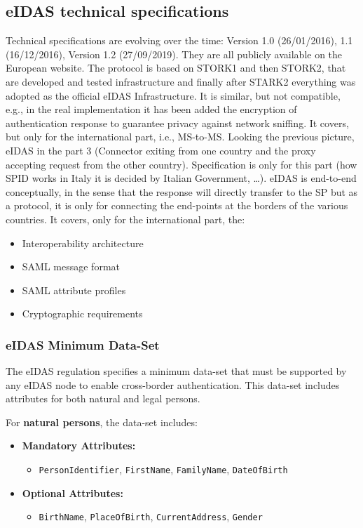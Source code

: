 \subsection{eIDAS technical specifications}
Technical specifications are evolving over the time: Version 1.0
(26/01/2016), 1.1 (16/12/2016), Version 1.2 (27/09/2019). They are all
publicly available on the European website. The protocol is based on
STORK1 and then STORK2, that are developed and tested infrastructure
and finally after STARK2 everything was adopted as the official eIDAS
Infrastructure. It is similar, but not compatible, e.g., in the real
implementation it has been added the encryption of authentication
response to guarantee privacy against network sniffing. It covers, but
only for the international part, i.e., MS-to-MS. Looking the previous
picture, eIDAS in the part 3 (Connector exiting from one country and
the proxy accepting request from the other country). Specification is
only for this part (how SPID works in Italy it is decided by Italian
Government, …). eIDAS is end-to-end conceptually, in the sense that
the response will directly transfer to the SP but as a protocol, it is
only for connecting the end-points at the borders of the various
countries. It covers, only for the international part, the:
\begin{itemize}
  \item Interoperability architecture
  \item SAML message format
  \item SAML attribute profiles
  \item Cryptographic requirements
\end{itemize}
\subsubsection{eIDAS Minimum Data-Set}

The eIDAS regulation specifies a minimum data-set that must be supported by any eIDAS node to enable cross-border authentication. This data-set includes attributes for both natural and legal persons.

For \textbf{natural persons}, the data-set includes:
\begin{itemize}
    \item \textbf{Mandatory Attributes:}
    \begin{itemize}
      \item \texttt{PersonIdentifier}, \texttt{FirstName},
        \texttt{FamilyName}, \texttt{DateOfBirth}
    \end{itemize}
    \item \textbf{Optional Attributes:}
    \begin{itemize}
        \item \texttt{BirthName}, \texttt{PlaceOfBirth},
          \texttt{CurrentAddress}, \texttt{Gender}
    \end{itemize}
\end{itemize}

